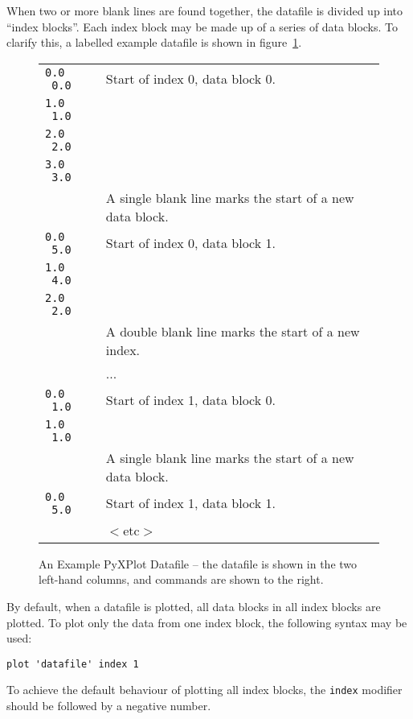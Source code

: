 \documentclass[a4paper,onecolumn,11pt]{book}
\begin{document}
When two or more blank lines are found together, the datafile is divided up
into ``index blocks''. Each index block may be made up of a series of data
blocks. To clarify this, a labelled example datafile is shown in
figure~\ref{sample_datafile}.

\begin{figure}
\begin{tabular}{p{2.2cm}l}
\hline
\texttt{0.0 \ 0.0} & Start of index 0, data block 0. \\
\texttt{1.0 \ 1.0} & \\
\texttt{2.0 \ 2.0} & \\
\texttt{3.0 \ 3.0} & \\
                   & A single blank line marks the start of a new data block. \\
\texttt{0.0 \ 5.0} & Start of index 0, data block 1. \\
\texttt{1.0 \ 4.0} & \\
\texttt{2.0 \ 2.0} & \\
                   & A double blank line marks the start of a new index. \\
                   & ... \\
\texttt{0.0 \ 1.0} & Start of index 1, data block 0. \\
\texttt{1.0 \ 1.0} & \\
                   & A single blank line marks the start of a new data block. \\
\texttt{0.0 \ 5.0} & Start of index 1, data block 1. \\
                   & $<$etc$>$ \\
\hline
\end{tabular}
\caption{An Example PyXPlot Datafile -- the datafile is shown in the two left-hand columns, and commands are shown to the right.}
\label{sample_datafile}
\end{figure}

By default, when a datafile is plotted, all data blocks in all index blocks are
plotted. To plot only the data from one index block, the following syntax may
be used:

\begin{verbatim}
plot 'datafile' index 1
\end{verbatim}

\noindent To achieve the default behaviour of plotting all index blocks, the
\texttt{index} modifier should be followed by a negative number.
\end{document}
